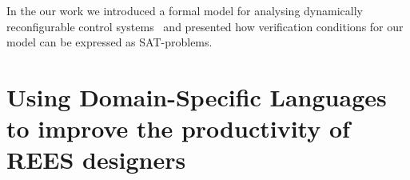 \documentclass[conference]{IEEEtran}
\begin{document}
In the our work we introduced a formal model for analysing dynamically reconfigurable control
systems~\cite{CPOG} and presented how verification conditions for our
model can be expressed as SAT-problems.







\section{Using Domain-Specific Languages to improve the
productivity of REES designers}
\end{document}
